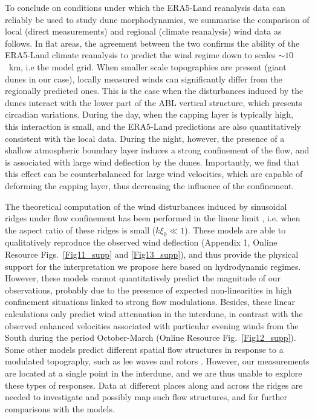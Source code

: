 To conclude on conditions under which the ERA5-Land reanalysis data can reliably be used to study dune morphodynamics, we summarise the comparison of local (direct measurements) and regional (climate reanalysis) wind data as follows. In flat areas, the agreement between the two confirms the ability of the ERA5-Land climate reanalysis to predict the wind regime down to scales $\sim10$~km, i.e the model grid. When smaller scale topographies are present (giant dunes in our case), locally measured winds can significantly differ from the regionally predicted ones. This is the case when the disturbances induced by the dunes interact with the lower part of the ABL vertical structure, which presents circadian variations. During the day, when the capping layer is typically high, this interaction is small, and the ERA5-Land predictions are also quantitatively consistent with the local data. During the night, however, the presence of a shallow atmospheric boundary layer induces a strong confinement of the flow, and is associated with large wind deflection by the dunes. Importantly, we find that this effect can be counterbalanced for large wind velocities, which are capable of deforming the capping layer, thus decreasing the influence of the confinement.

The theoretical computation of the wind disturbances induced by sinusoidal ridges under flow confinement has been performed in the linear limit \citep{Andreotti2009, Andreotti2012}, i.e. when the aspect ratio of these ridges is small ($k\xi_0 \ll 1$). These models are able to qualitatively reproduce the observed wind deflection (Appendix 1, Online Resource Figs.~\ref{Fig11_supp} and \ref{Fig13_supp}), and thus provide the physical support for the interpretation we propose here based on hydrodynamic regimes. However, these models cannot quantitatively predict the magnitude of our observations, probably due to the presence of expected non-linearities in high confinement situations linked to strong flow modulations. Besides, these linear calculations only predict wind attenuation in the interdune, in contrast with the observed enhanced velocities associated with particular evening winds from the South during the period October-March (Online Resource Fig.~\ref{Fig12_supp}). Some other models predict different spatial flow structures in response to a modulated topography, such as lee waves and rotors \citep{baines1995, Vosper2004}. However, our measurements are located at a single point in the interdune, and we are thus unable to explore these types of responses. Data at different places along and across the ridges are needed to investigate and possibly map such flow structures, and for further comparisons with the models.


